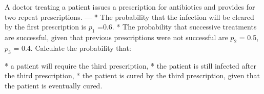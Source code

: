 
A doctor treating a patient issues a prescription for antibiotics and provides for two repeat prescriptions. 
--- 
    * The probability that the infection will be cleared by the first prescription is $p_1$ =0.6.
* The probability that successive treatments are successful, given that previous prescriptions were not successful are $p_2$ = 0.5, $p_3$ = 0.4.
 Calculate the probability that:

\begin{enumerate}[(a)]
* a patient will require the third prescription,
* the patient is still infected after the third prescription,
* the patient is cured by the third prescription, given that the patient is eventually cured.
\end{enumerate}



